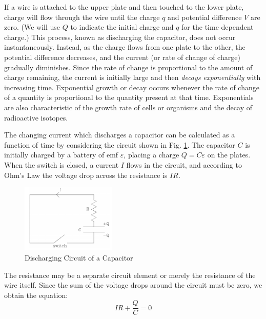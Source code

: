 If a wire is attached to the upper plate and then touched to the lower plate, charge will flow through the wire until the charge $q$ and potential difference $V$ are zero. (We will use $Q$ to indicate the initial charge and $q$ for the time dependent charge.) This process, known as discharging the capacitor, does not occur instantaneously. Instead, as the charge flows from one plate to the other, the potential difference decreases, and the current (or rate of change of charge) gradually diminishes. Since the rate of change is proportional to the amount of charge remaining, the current is initially large and then \emph{decays exponentially} with increasing time. Exponential growth or decay occurs whenever the rate of change of a quantity is proportional to the quantity present at that time. Exponentials are also characteristic of the growth rate of cells or organisms and the decay of radioactive isotopes.

The changing current which discharges a capacitor can be calculated as a function of time by considering the circuit shown in Fig.  \ref{fig:capcircuit1}. The capacitor $C$ is initially charged by a battery of emf $\varepsilon$, placing a charge $Q = C\varepsilon$ on the plates. When the switch is closed, a current $I$ flows in the circuit, and according to Ohm's Law the voltage drop across the resistance is $IR$.

\begin{figure}[h]
    \begin{center}
        \includegraphics[width=0.4\textwidth]{./Exp4/pic/image2.png}
    \end{center}
    \caption{Discharging Circuit of a Capacitor}
    \label{fig:capcircuit1}
\end{figure}

The resistance may be a separate circuit element or merely the resistance of the wire itself. Since the sum of the voltage drops around the circuit must be zero, we obtain the equation:
\begin{equation}
    IR + \frac{Q}{C} = 0
\end{equation}

